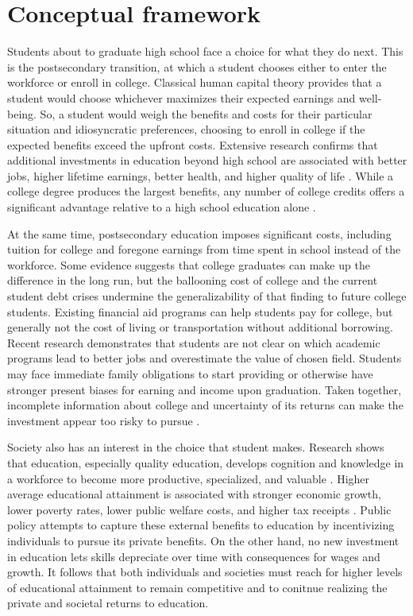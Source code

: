\documentclass[12pt,letterpaper]{article}
\begin{document}
\section{Conceptual framework}

Students about to graduate high school face a choice for what they do next. This is the postsecondary transition, at which a student chooses either to enter the workforce or enroll in college. Classical human capital theory provides that a student would choose whichever maximizes their expected earnings and well-being. So, a student would weigh the benefits and costs for their particular situation and idiosyncratic preferences, choosing to enroll in college if the expected benefits exceed the upfront costs. Extensive research confirms that additional investments in education beyond high school are associated with better jobs, higher lifetime earnings, better health, and higher quality of life \cite{eide-showalter:2010}. While a college degree produces the largest benefits, any number of college credits offers a significant advantage relative to a high school education alone \cite{kane-rouse:1995}.

At the same time, postsecondary education imposes significant costs, including tuition for college and foregone earnings from time spent in school instead of the workforce. Some evidence suggests that college graduates can make up the difference in the long run, but the ballooning cost of college and the current student debt crises undermine the generalizability of that finding to future college students. Existing financial aid programs can help students pay for college, but generally not the cost of living or transportation without additional borrowing. Recent research demonstrates that students are not clear on which academic programs lead to better jobs and overestimate the value of chosen field. Students may face immediate family obligations to start providing or otherwise have stronger present biases for earning and income upon graduation. Taken together, incomplete information about college and uncertainty of its returns can make the investment appear too risky to pursue \cite{plank-davis:2010}.

Society also has an interest in the choice that student makes. Research shows that education, especially quality education, develops cognition and knowledge in a workforce to become more productive, specialized, and valuable \cite{hanushek-wößmann:2010}. Higher average educational attainment is associated with stronger economic growth, lower poverty rates, lower public welfare costs, and higher tax receipts \cite{mcmahon:2010}. Public policy attempts to capture these external benefits to education by incentivizing individuals to pursue its private benefits. On the other hand, no new investment in education lets skills depreciate over time with consequences for wages and growth. It follows that both individuals and societies must reach for higher levels of educational attainment to remain competitive and to conitnue realizing the private and societal returns to education.
\end{document}
